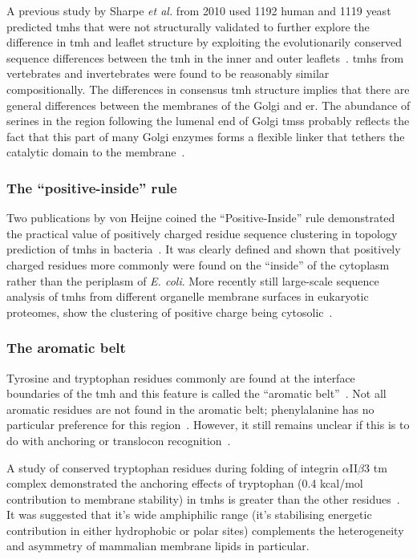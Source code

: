 A previous study by Sharpe \textit{et al.} from 2010 used 1192 human and 1119 yeast predicted \gls{tmh}s that were not structurally validated to further explore the difference in \gls{tmh} and leaflet structure by exploiting the evolutionarily conserved sequence differences between the \gls{tmh} in the inner and outer leaflets~\cite{Sharpe2010}.
\gls{tmh}s from vertebrates and invertebrates were found to be reasonably similar compositionally.
The differences in consensus \gls{tmh} structure implies that there are general differences between the membranes of the Golgi and \gls{er}.
The abundance of serines in the region following the lumenal end of Golgi \gls{tms}s probably reflects the fact that this part of many Golgi enzymes forms a flexible linker that tethers the catalytic domain to the membrane~\cite{Sharpe2010}.

\subsubsection{The ``positive\--inside'' rule}

Two publications by von Heijne coined the ``Positive-Inside'' rule demonstrated the practical value of positively charged residue sequence clustering in topology prediction of \gls{tmh}s in bacteria~\cite{VonHeijne1989,Andersson1992}.
It was clearly defined and shown that positively charged residues more commonly were found on the ``inside'' of the cytoplasm rather than the periplasm of \textit{ E.
coli}.
More recently still large-scale sequence analysis of \gls{tmh}s from different organelle membrane surfaces in eukaryotic proteomes, show the clustering of positive charge being cytosolic~\cite{Sharpe2010, Baeza-Delgado2013, Pogozheva2013}.

\subsubsection{The aromatic belt}

Tyrosine and tryptophan residues commonly are found at the interface boundaries of the \gls{tmh} and this feature is called the ``aromatic belt''~\cite{Hessa2005, Granseth2005, Sharpe2010, Baeza-Delgado2013, Nilsson2005a}.
Not all aromatic residues are not found in the aromatic belt; phenylalanine has no particular preference for this region~\cite{Granseth2005, Braun1999}.
However, it still remains unclear if this is to do with anchoring or translocon recognition~\cite{Baeza-Delgado2013}.

A study of conserved tryptophan residues during folding of integrin $\alpha$II$\beta$3 \gls{tm} complex demonstrated the anchoring effects of tryptophan (0.4 kcal/mol contribution to membrane stability) in \gls{tmh}s is greater than the other residues~\cite{Situ2018}. It was suggested that it's wide amphiphilic range (it's stabilising energetic contribution in either hydrophobic or polar sites) complements the heterogeneity and asymmetry of mammalian membrane lipids in particular.

